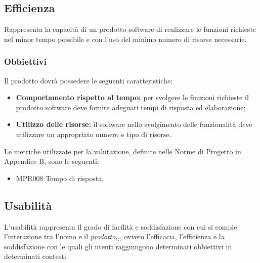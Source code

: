 \subsection{Efficienza}
Rappresenta la capacità di un prodotto software di realizzare le funzioni richieste nel minor tempo possibile e con l'uso del minimo numero di risorse necessarie. 
\subsubsection{Obbiettivi } Il prodotto dovrà possedere le seguenti caratteristiche:
\begin{itemize}
	\item \textbf{Comportamento rispetto al tempo:} per svolgere le  funzioni richieste il prodotto software deve fornire adeguati tempi di risposta ed elaborazione;
	\item \textbf{Utilizzo delle risorse:} il software nello svolgimento delle funzionalità deve utilizzare un appropriato numero e tipo di risorse.
\end{itemize}
Le metriche utilizzate per la valutazione, definite nelle Norme di Progetto in Appendice B, sono le seguenti:
\begin{itemize}
	\item MPR008 Tempo di risposta.
\end{itemize}

\subsection{Usabilità}
L'usabilità rappresenta il grado di facilità e soddisfazione con cui si compie l'interazione tra l'uomo e il \textit{prodotto$_{G}$}, ovvero l'efficacia, l'efficienza e la soddisfazione con le quali gli utenti raggiungono determinati obbiettivi in determinati contesti.
